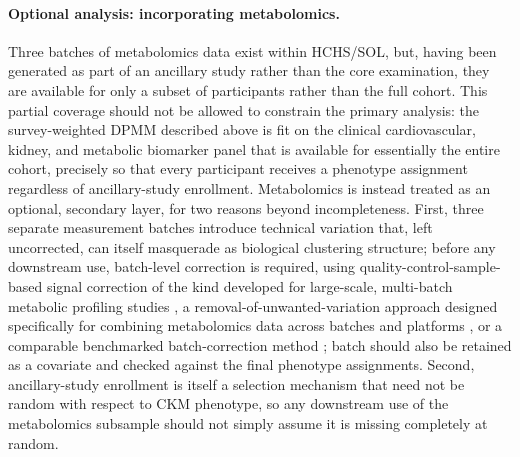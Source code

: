 \documentclass[11pt]{article}
\begin{document}
\paragraph{Optional analysis: incorporating metabolomics.} Three batches of metabolomics data exist within HCHS/SOL, but, having been generated as part of an ancillary study rather than the core examination, they are available for only a subset of participants rather than the full cohort. This partial coverage should not be allowed to constrain the primary analysis: the survey-weighted DPMM described above is fit on the clinical cardiovascular, kidney, and metabolic biomarker panel that is available for essentially the entire cohort, precisely so that every participant receives a phenotype assignment regardless of ancillary-study enrollment. Metabolomics is instead treated as an optional, secondary layer, for two reasons beyond incompleteness. First, three separate measurement batches introduce technical variation that, left uncorrected, can itself masquerade as biological clustering structure; before any downstream use, batch-level correction is required, using quality-control-sample-based signal correction of the kind developed for large-scale, multi-batch metabolic profiling studies \citep{dunn2011procedures}, a removal-of-unwanted-variation approach designed specifically for combining metabolomics data across batches and platforms \citep{delivera2012normalizing}, or a comparable benchmarked batch-correction method \citep{wehrens2016improved}; batch should also be retained as a covariate and checked against the final phenotype assignments. Second, ancillary-study enrollment is itself a selection mechanism that need not be random with respect to CKM phenotype, so any downstream use of the metabolomics subsample should not simply assume it is missing completely at random.
\end{document}
